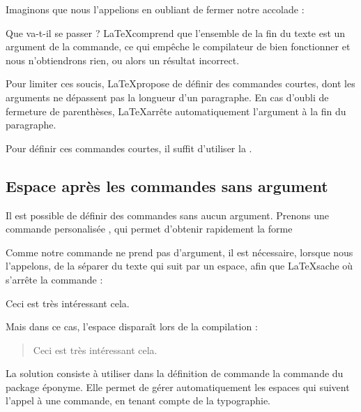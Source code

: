 Imaginons que nous l'appelions en oubliant de fermer notre accolade :

\begin{latexcode}
Il est bien connu que \auteur{Tertullien n'était pas montaniste mais tertullianiste.
\end{latexcode}

Que va-t-il se passer ? \LaTeX comprend que l'ensemble de la fin du texte est un argument de la commande, ce qui empêche le compilateur de bien fonctionner  et nous n'obtiendrons rien, ou alors un résultat incorrect.

Pour limiter ces soucis, \LaTeX propose de définir des commandes courtes, dont les arguments ne dépassent pas la longueur d'un paragraphe. En cas d'oubli de fermeture de parenthèses, \LaTeX arrête automatiquement l'argument à la fin du paragraphe.

Pour définir ces commandes courtes, il suffit d'utiliser la .

\begin{latexcode}
\newcommand*{\auteur}[1]{\textsc{#1}*}
\end{latexcode}

\subsection{Espace après les commandes sans argument}


Il est possible de définir des commandes sans aucun argument. Prenons une commande personalisée , qui permet d'obtenir rapidement la forme \forme{\cf}

\begin{latexcode}
\newcommand{\cf}[0]{\emph{cf.}}
\end{latexcode}

Comme notre commande ne prend pas d'argument, il est nécessaire, lorsque nous l'appelons, de la séparer du texte qui suit par un espace, afin que \LaTeX sache où s'arrête la commande : 

\begin{latexcode}
Ceci est très intéressant \cf cela.
\end{latexcode}

Mais dans ce cas, l'espace disparaît lors de la compilation :

\begin{quotation}
Ceci est très intéressant \cf cela.
\end{quotation}

La solution consiste à utiliser dans la définition de commande la commande  du package éponyme. Elle permet de gérer automatiquement les espaces qui suivent l'appel à une commande, en tenant compte de la typographie.

